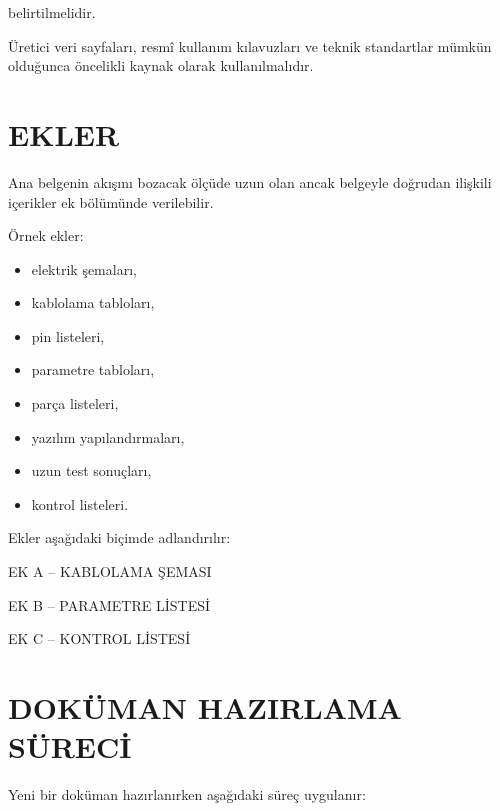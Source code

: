 \documentclass[11pt,a4paper]{article}
\begin{document}
belirtilmelidir.

Üretici veri sayfaları,
resmî kullanım kılavuzları
ve teknik standartlar mümkün olduğunca öncelikli kaynak olarak
kullanılmalıdır.


\newpage

\section{EKLER}

Ana belgenin akışını bozacak ölçüde uzun olan ancak belgeyle doğrudan
ilişkili içerikler ek bölümünde verilebilir.

Örnek ekler:

\begin{itemize}
    \item elektrik şemaları,
    \item kablolama tabloları,
    \item pin listeleri,
    \item parametre tabloları,
    \item parça listeleri,
    \item yazılım yapılandırmaları,
    \item uzun test sonuçları,
    \item kontrol listeleri.
\end{itemize}

Ekler aşağıdaki biçimde adlandırılır:

\begin{center}

EK A -- KABLOLAMA ŞEMASI

EK B -- PARAMETRE LİSTESİ

EK C -- KONTROL LİSTESİ

\end{center}


\newpage

\section{DOKÜMAN HAZIRLAMA SÜRECİ}

Yeni bir doküman hazırlanırken aşağıdaki süreç uygulanır:
\end{document}
